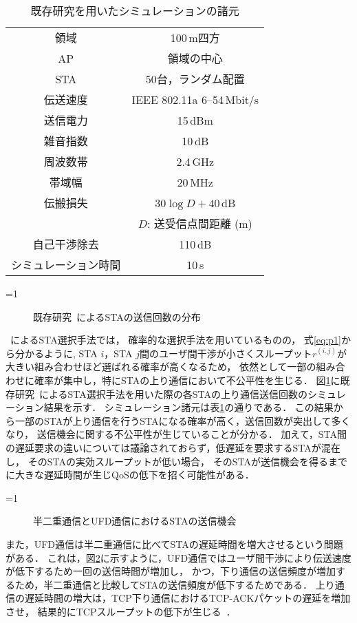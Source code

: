 \documentclass[technicalreport]{ieicej}
\newcounter{flagFig}
\newcommand{\sij}{(i,j)}
\newcommand{\rij}{r^{\sij}}
\begin{document}
		\par
		\begin{table}[t]
			\centering
			\caption{既存研究\cite{promac}を用いたシミュレーションの諸元}
			\label{tab:test}
			\begin{tabular}{cc} \hline
				領域 & 100\,m四方 \\
				AP & 領域の中心 \\
				STA & 50台，ランダム配置 \\
				伝送速度 & IEEE 802.11a 6--54\,Mbit/s \\
				送信電力 & 15\,dBm \\
				雑音指数 & 10\,dB \\
				周波数帯 & 2.4\,GHz \\
				帯域幅 & 20\,MHz \\
				伝搬損失 & $30\log D + 40$\,dB\\
				&$D$: 送受信点間距離 (m)\\
				自己干渉除去 & 110\,dB \\
				シミュレーション時間 & 10\,s \\\hline
			\end{tabular}
		\end{table}
		\ifnum\value{flagFig}=1 {\begin{figure}[t]
			\centering
			\caption{既存研究~\cite{promac}によるSTAの送信回数の分布}
			\label{fig:numtx}
		\end{figure}}\fi
		~\cite{promac}によるSTA選択手法では，
		確率的な選択手法を用いているものの，
		式\eqref{eq:p1}から分かるように,
		STA $i$，STA $j$間のユーザ間干渉が小さくスループット$\rij$が大きい組み合わせほど選ばれる確率が高くなるため，
		依然として一部の組み合わせに確率が集中し，特にSTAの上り通信において不公平性を生じる．
		図\ref{fig:numtx}に既存研究~\cite{promac}によるSTA選択手法を用いた際の各STAの上り通信送信回数のシミュレーション結果を示す．
		シミュレーション諸元は表\ref{tab:test}の通りである．
		この結果から一部のSTAが上り通信を行うSTAになる確率が高く，送信回数が突出して多くなり，
		送信機会に関する不公平性が生じていることが分かる．
		加えて，STA間の遅延要求の違いについては議論されておらず，低遅延を要求するSTAが混在し，
		そのSTAの実効スループットが低い場合，
		そのSTAが送信機会を得るまでに大きな遅延時間が生じQoSの低下を招く可能性がある．
		\par
		\ifnum\value{flagFig}=1 {\begin{figure}[t]
			\centering
			\caption{半二重通信とUFD通信におけるSTAの送信機会}
			\label{fig:problem}
		\end{figure}}\fi
		また，UFD通信は半二重通信に比べてSTAの遅延時間を増大させるという問題がある．
		これは，図\ref{fig:problem}に示すように，UFD通信ではユーザ間干渉により伝送速度が低下するため一回の送信時間が増加し，
		かつ，下り通信の送信頻度が増加するため，半二重通信と比較してSTAの送信頻度が低下するためである．
		上り通信の遅延時間の増大は，TCP下り通信におけるTCP-ACKパケットの遅延を増加させ，
		結果的にTCPスループットの低下が生じる~\cite{rtt}．
\end{document}
